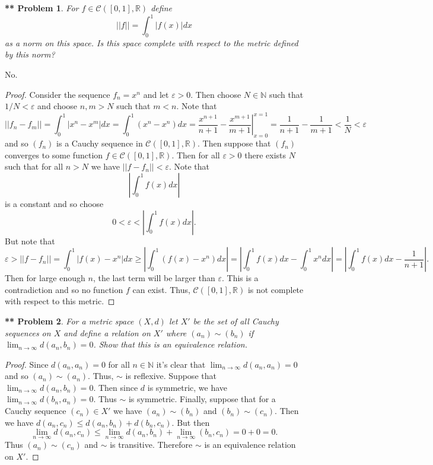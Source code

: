 \documentclass{article}
\newtheorem{**}{** Problem}
\begin{document}
\begin{flushleft}
\begin{**}
For $f \in \mathcal{C} ([0,1], \mathbb{R})$ define
\[
||f|| = \int_0^1 |f(x)| dx
\]
as a norm on this space. Is this space complete with respect to the metric defined by this norm?
\end{**}
No.
\begin{proof}
Consider the sequence $f_n = x^n$ and let $\varepsilon > 0$. Then choose $N \in \mathbb{N}$ such that $1/N < \varepsilon$ and choose $n, m > N$ such that $m < n$. Note that
\[
||f_n - f_m|| = \int_0^1 |x^n - x^m| dx = \int_0^1 (x^n - x^n) dx = \left. \frac{x^{n+1}}{n+1} - \frac{x^{m+1}}{m+1} \right |_{x=0}^{x=1} = \frac{1}{n+1} - \frac{1}{m+1} < \frac{1}{N} < \varepsilon
\]
and so $(f_n)$ is a Cauchy sequence in $\mathcal{C} ([0,1], \mathbb{R})$. Then suppose that $(f_n)$ converges to some function $f \in \mathcal{C} ([0,1], \mathbb{R})$. Then for all $\varepsilon > 0$ there exists $N$ such that for all $n > N$ we have $||f - f_n|| < \varepsilon$. Note that
\[
|\int_0^1 f(x) dx|
\]
is a constant and so choose
\[
0 < \varepsilon < \left | \int_0^1 f(x) dx \right |.
\]
But note that
\[
\varepsilon > ||f - f_n|| = \int_0^1 |f(x) - x^n| dx \geq \left | \int_0^1 (f(x) - x^n) dx \right | = \left | \int_0^1 f(x) dx - \int_0^1 x^n dx \right | = \left | \int_0^1 f(x) dx - \frac{1}{n+1} \right |.
\]
Then for large enough $n$, the last term will be larger than $\varepsilon$. This is a contradiction and so no function $f$ can exist. Thus, $\mathcal{C} ([0,1], \mathbb{R})$ is not complete with respect to this metric.
\end{proof}

\begin{**}
For a metric space $(X, d)$ let $X'$ be the set of all Cauchy sequences on $X$ and define a relation on $X'$ where $(a_n) \sim (b_n)$ if $\lim_{n \rightarrow \infty} d(a_n, b_n) = 0$. Show that this is an equivalence relation.
\end{**}
\begin{proof}
Since $d(a_n, a_n) = 0$ for all $n \in \mathbb{N}$ it's clear that $\lim_{n \rightarrow \infty} d(a_n, a_n) = 0$ and so $(a_n) \sim (a_n)$. Thus, $\sim$ is reflexive. Suppose that $\lim_{n \rightarrow \infty} d(a_n, b_n) = 0$. Then since $d$ is symmetric, we have $\lim_{n \rightarrow \infty} d(b_n, a_n) = 0$. Thus $\sim$ is symmetric. Finally, suppose that for a Cauchy sequence $(c_n) \in X'$ we have $(a_n) \sim (b_n)$ and $(b_n) \sim (c_n)$. Then we have $d(a_n, c_n) \leq d(a_n, b_n) + d(b_n, c_n)$. But then
\[
\lim_{n \rightarrow \infty} d(a_n, c_n) \leq \lim_{n \rightarrow \infty} d(a_n, b_n) + \lim_{n \rightarrow \infty} (b_n, c_n) = 0 + 0 = 0.
\]
Thus $(a_n) \sim (c_n)$ and $\sim$ is transitive. Therefore $\sim$ is an equivalence relation on $X'$.
\end{proof}


\end{flushleft}
\end{document}
